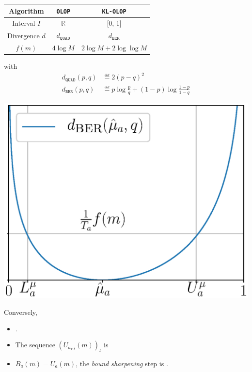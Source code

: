 \documentclass[paperwidth=36in, paperheight=48in,portrait,fontscale=0.35, margin=2cm]{baposter}
\begin{document}
\begin{poster}
{\begin{minipage}[]{0.59\textwidth}
    \begin{center}
    \begin{tabular}{ccc}
    \toprule
        Algorithm & \texttt{OLOP} & \texttt{KL-OLOP} \\
        \midrule
        Interval $I$ & $\mathbb{R}$ & [0, 1] \\
        Divergence $d$ & $d_{\texttt{QUAD}}$ & $d_{\texttt{BER}}$ \\
        $f(m)$ & $4 \log M$ & $2\log M + 2 \log\log M$\\
        \bottomrule
    \end{tabular}
    \end{center}
    with
    \begin{align*}
    d_{\texttt{QUAD}}(p,q) &\eqdef 2(p-q)^2\\
    d_{\texttt{BER}}(p, q) &\eqdef p \log \frac{p}{q} + (1-p)\log\frac{1-p}{1-q}
    \end{align*}
\end{minipage}
\begin{minipage}[]{0.4\textwidth}
    \includegraphics[width=\textwidth]{../img/ukl}
\end{minipage}
    
Conversely,
\begin{itemize}
    \item {}. 
    \item The sequence $(U_{a_{1:t}}(m))_t$ is 
    \item $B_a(m) = U_a(m)$, the \emph{bound sharpening} step is .
\end{itemize}
}


\end{poster}
\end{document}
